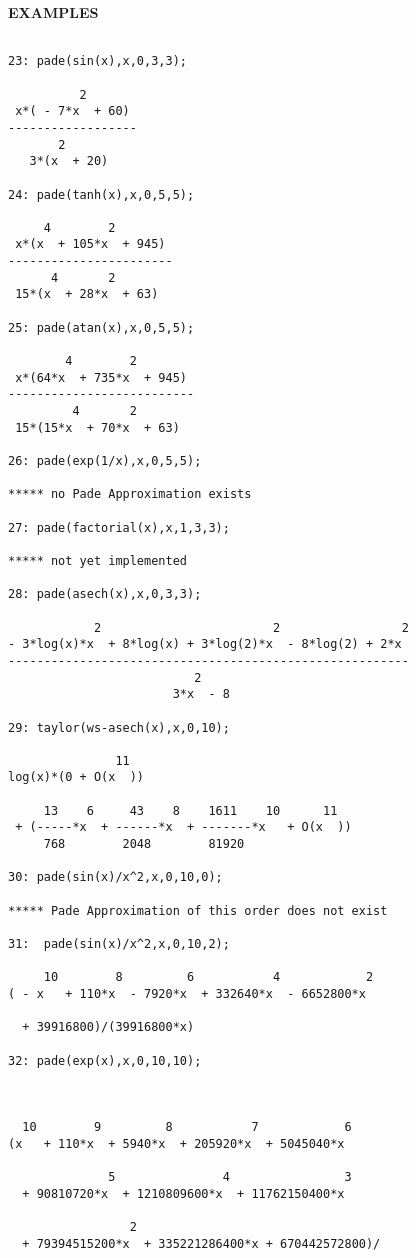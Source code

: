 {\large\textbf{EXAMPLES}}

\begin{verbatim}

23: pade(sin(x),x,0,3,3);

          2
 x*( - 7*x  + 60)
------------------
       2
   3*(x  + 20)

24: pade(tanh(x),x,0,5,5);

     4        2
 x*(x  + 105*x  + 945)
-----------------------
      4       2
 15*(x  + 28*x  + 63)

25: pade(atan(x),x,0,5,5);

        4        2
 x*(64*x  + 735*x  + 945)
--------------------------
         4       2
 15*(15*x  + 70*x  + 63)

26: pade(exp(1/x),x,0,5,5);

***** no Pade Approximation exists

27: pade(factorial(x),x,1,3,3);

***** not yet implemented

28: pade(asech(x),x,0,3,3);

            2                        2                 2
- 3*log(x)*x  + 8*log(x) + 3*log(2)*x  - 8*log(2) + 2*x
--------------------------------------------------------
                          2
                       3*x  - 8

29: taylor(ws-asech(x),x,0,10);

               11  
log(x)*(0 + O(x  ))

     13    6     43    8    1611    10      11
 + (-----*x  + ------*x  + -------*x   + O(x  ))
     768        2048        81920

30: pade(sin(x)/x^2,x,0,10,0);

***** Pade Approximation of this order does not exist

31:  pade(sin(x)/x^2,x,0,10,2);

     10        8         6           4            2
( - x   + 110*x  - 7920*x  + 332640*x  - 6652800*x

  + 39916800)/(39916800*x)

32: pade(exp(x),x,0,10,10);



  10        9         8           7            6
(x   + 110*x  + 5940*x  + 205920*x  + 5045040*x

              5               4                3
  + 90810720*x  + 1210809600*x  + 11762150400*x

                 2
  + 79394515200*x  + 335221286400*x + 670442572800)/


\end{verbatim}
